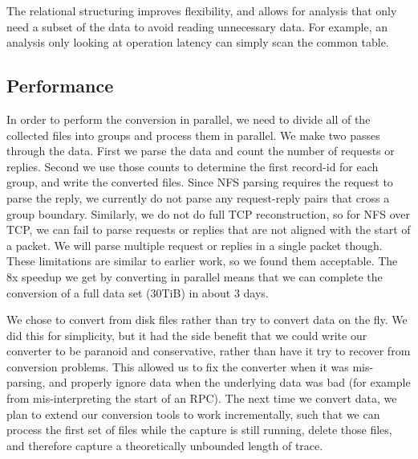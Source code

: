 The relational structuring improves flexibility, and allows for
analysis that only need a subset of the data to avoid reading
unnecessary data.  For example, an analysis only looking at operation
latency can simply scan the common table.

\subsection{Performance}

In order to perform the conversion in parallel, we need to divide all
of the collected files into groups and process them in parallel.  We
make two passes through the data.  First we parse the data and count
the number of requests or replies.  Second we use those counts to
determine the first record-id for each group, and write the converted files.
Since NFS parsing requires the request to parse the
reply, we currently do not parse any request-reply pairs that cross a
group boundary.  Similarly, we do not do full TCP reconstruction, so
for NFS over TCP, we can fail to parse requests or replies that are
not aligned with the start of a packet.  We will parse multiple
request or replies in a single packet though.  These limitations are similar
to earlier work, so we found them acceptable.  The 8x speedup we get
by converting in parallel means that we can complete the conversion of
a full data set (30TiB) in about 3 days.

We chose to convert from disk files rather than try to convert data on
the fly.  We did this for simplicity, but it had the side benefit that
we could write our converter to be paranoid and conservative, rather
than have it try to recover from conversion problems.  This allowed us
to fix the converter when it was mis-parsing, and properly ignore data
when the underlying data was bad (for example from mis-interpreting
the start of an RPC).  The next time we convert data, we plan to
extend our conversion tools to work incrementally, such that we can
process the first set of files while the capture is still running,
delete those files, and therefore capture a theoretically unbounded
length of trace.


